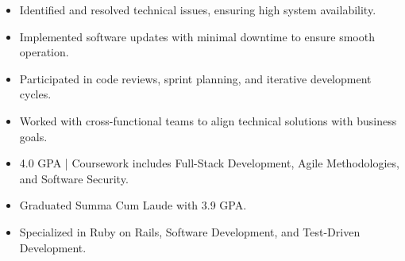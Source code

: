 \par\smallskip
\noindent
\begin{minipage}{20cm}
  \begin{minipage}{9.75cm}
    \begin{itemize}
      \item Identified and resolved technical issues, ensuring high system availability.
      \item Implemented software updates with minimal downtime to ensure smooth operation.
    \end{itemize}
  \end{minipage}
  \hfill
  \begin{minipage}{9.75cm}
    \begin{itemize}
      \item Participated in code reviews, sprint planning, and iterative development cycles.
      \item Worked with cross-functional teams to align technical solutions with business goals.
    \end{itemize}
  \end{minipage}
\end{minipage}
\par\smallskip
\divider

\begin{itemize}
  \item 4.0 GPA | Coursework includes Full-Stack Development, Agile Methodologies, and Software Security.
\end{itemize}
\divider

\begin{itemize}
  \item Graduated Summa Cum Laude with 3.9 GPA.
  \item Specialized in Ruby on Rails, Software Development, and Test-Driven Development.
\end{itemize}

\noindent
\begin{minipage}{20cm}
\end{minipage}


